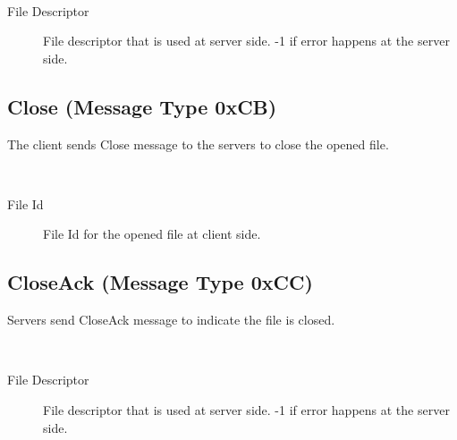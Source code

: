 \documentclass[12pt,fleqn]{article}
\begin{document}
\begin{center}
	\begin{bytefield}[bitwidth=1.1em]{16}
		 \\
	\end{bytefield}
\end{center}

\begin{description}
	\item[File Descriptor] File descriptor that is used at server side. -1 if error happens at the server side.
\end{description}

\subsection{Close (Message Type 0xCB)}
The client sends Close message to the servers to close the opened file.

\begin{center}
	\begin{bytefield}[bitwidth=1.1em]{16}
		 \\
	\end{bytefield}
\end{center}

\begin{description}
	\item[File Id] File Id for the opened file at client side.
\end{description}

\subsection{CloseAck (Message Type 0xCC)}
Servers send CloseAck message to indicate the file is closed.

\begin{center}
	\begin{bytefield}[bitwidth=1.1em]{16}
		 \\
	\end{bytefield}
\end{center}

\begin{description}
	\item[File Descriptor] File descriptor that is used at server side. -1 if error happens at the server side.
\end{description}
\end{document}
